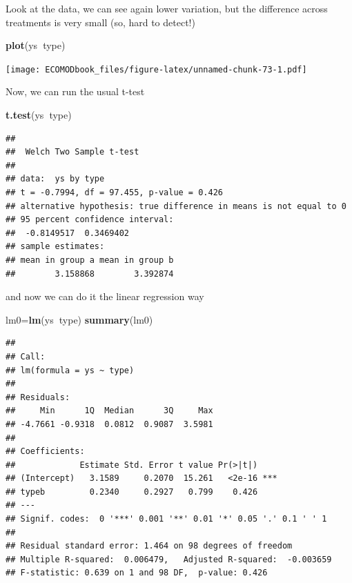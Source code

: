 \documentclass[
]{book}
\newenvironment{Shaded}{\begin{snugshade}}{\end{snugshade}}
\newcommand{\KeywordTok}[1]{\textcolor[rgb]{0.13,0.29,0.53}{\textbf{#1}}}
\newcommand{\NormalTok}[1]{#1}
\newcommand{\OperatorTok}[1]{\textcolor[rgb]{0.81,0.36,0.00}{\textbf{#1}}}
\begin{document}
Look at the data, we can see again lower variation, but the difference across treatments is very small (so, hard to detect!)

\begin{Shaded}
\begin{Highlighting}[]
\KeywordTok{plot}\NormalTok{(ys}\OperatorTok{~}\NormalTok{type)}
\end{Highlighting}
\end{Shaded}

\texttt{[image: ECOMODbook\_files/figure-latex/unnamed-chunk-73-1.pdf]}

Now, we can run the usual t-test

\begin{Shaded}
\begin{Highlighting}[]
\KeywordTok{t.test}\NormalTok{(ys}\OperatorTok{~}\NormalTok{type)}
\end{Highlighting}
\end{Shaded}

\begin{verbatim}
## 
## 	Welch Two Sample t-test
## 
## data:  ys by type
## t = -0.7994, df = 97.455, p-value = 0.426
## alternative hypothesis: true difference in means is not equal to 0
## 95 percent confidence interval:
##  -0.8149517  0.3469402
## sample estimates:
## mean in group a mean in group b 
##        3.158868        3.392874
\end{verbatim}

and now we can do it the linear regression way

\begin{Shaded}
\begin{Highlighting}[]
\NormalTok{lm0=}\KeywordTok{lm}\NormalTok{(ys}\OperatorTok{~}\NormalTok{type)}
\KeywordTok{summary}\NormalTok{(lm0)}
\end{Highlighting}
\end{Shaded}

\begin{verbatim}
## 
## Call:
## lm(formula = ys ~ type)
## 
## Residuals:
##     Min      1Q  Median      3Q     Max 
## -4.7661 -0.9318  0.0812  0.9087  3.5981 
## 
## Coefficients:
##             Estimate Std. Error t value Pr(>|t|)    
## (Intercept)   3.1589     0.2070  15.261   <2e-16 ***
## typeb         0.2340     0.2927   0.799    0.426    
## ---
## Signif. codes:  0 '***' 0.001 '**' 0.01 '*' 0.05 '.' 0.1 ' ' 1
## 
## Residual standard error: 1.464 on 98 degrees of freedom
## Multiple R-squared:  0.006479,	Adjusted R-squared:  -0.003659 
## F-statistic: 0.639 on 1 and 98 DF,  p-value: 0.426
\end{verbatim}
\end{document}
